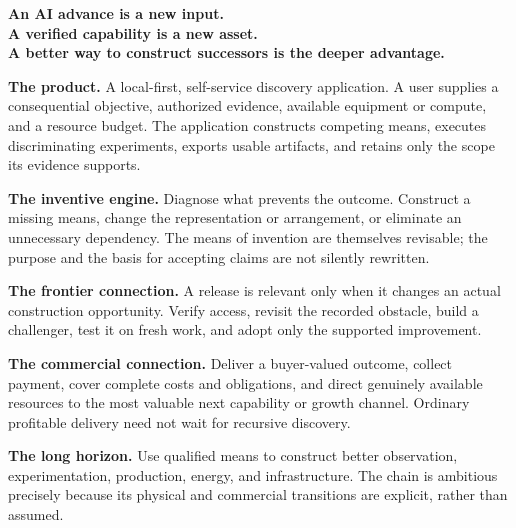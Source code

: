 \documentclass[11pt,letterpaper]{article}
\theoremstyle{remark}\newtheorem{remark}{Remark}[section]
\newcommand{\smallhead}[1]{\par\smallskip{\sffamily\bfseries\color{Gold}#1}\par\smallskip}
\begin{document}
\clearpage
\smallhead{THE PAPER AT A GLANCE}
\begin{thesisbox}
\Large\bfseries An AI advance is a new input.\\A verified capability is a new asset.\\A better way to construct successors is the deeper advantage.
\end{thesisbox}
\textbf{The product.} A local-first, self-service discovery application. A user supplies a consequential objective, authorized evidence, available equipment or compute, and a resource budget. The application constructs competing means, executes discriminating experiments, exports usable artifacts, and retains only the scope its evidence supports.

\textbf{The inventive engine.} Diagnose what prevents the outcome. Construct a missing means, change the representation or arrangement, or eliminate an unnecessary dependency. The means of invention are themselves revisable; the purpose and the basis for accepting claims are not silently rewritten.

\textbf{The frontier connection.} A release is relevant only when it changes an actual construction opportunity. Verify access, revisit the recorded obstacle, build a challenger, test it on fresh work, and adopt only the supported improvement.

\textbf{The commercial connection.} Deliver a buyer-valued outcome, collect payment, cover complete costs and obligations, and direct genuinely available resources to the most valuable next capability or growth channel. Ordinary profitable delivery need not wait for recursive discovery.

\textbf{The long horizon.} Use qualified means to construct better observation, experimentation, production, energy, and infrastructure. The chain is ambitious precisely because its physical and commercial transitions are explicit, rather than assumed.
\end{document}
